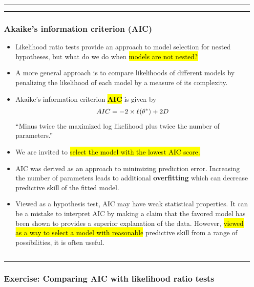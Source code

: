 \documentclass[]{article}
\begin{document}
\begin{center}\rule{0.5\linewidth}{\linethickness}\end{center}

\begin{center}\rule{0.5\linewidth}{\linethickness}\end{center}

\subsubsection{Akaike's information criterion
(AIC)}\label{akaikes-information-criterion-aic}

\begin{itemize}
\item
  Likelihood ratio tests provide an approach to model selection for
  nested hypotheses, but what do we do when \hl{models are not nested?}
\item
  A more general approach is to compare likelihoods of different models
  by penalizing the likelihood of each model by a measure of its
  complexity.
\item
  Akaike's information criterion \hl{\textbf{AIC}} is given by
  \[ AIC = -2 \times \ell(\theta^*) + 2D\] ``Minus twice the
  maximized log likelihood plus twice the number of parameters.''
\item
  We are invited to \hl{select the model with the lowest AIC score.}
\item
  AIC was derived as an approach to minimizing prediction error.
  Increasing the number of parameters leads to additional
  \textbf{overfitting} which can decrease predictive skill of the fitted
  model.
\item
  Viewed as a hypothesis test, AIC may have weak statistical properties.
  It can be a mistake to interpret AIC by making a claim that the
  favored model has been shown to provides a superior explanation of the
  data. However, \hl{viewed as a way to select a model with reasonable}
  predictive skill from a range of possibilities, it is often useful.
\end{itemize}

\begin{center}\rule{0.5\linewidth}{\linethickness}\end{center}

\begin{center}\rule{0.5\linewidth}{\linethickness}\end{center}

\subsubsection{Exercise: Comparing AIC with likelihood ratio
tests}\label{exercise-comparing-aic-with-likelihood-ratio-tests}
\end{document}
